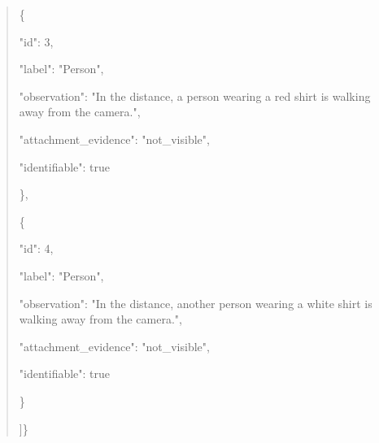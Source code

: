 \documentclass[10pt,a4paper]{article}
\begin{document}
\begin{quote}
\{\par
"id":\allowbreak{} 3,\allowbreak{}\par
"label":\allowbreak{} "Person",\allowbreak{}\par
"observation":\allowbreak{} "In the distance,\allowbreak{} a person wearing a red shirt is walking away from the camera.",\allowbreak{}\par
"attachment\_evidence":\allowbreak{} "not\_visible",\allowbreak{}\par
"identifiable":\allowbreak{} true\par
\},\allowbreak{}\par
\{\par
"id":\allowbreak{} 4,\allowbreak{}\par
"label":\allowbreak{} "Person",\allowbreak{}\par
"observation":\allowbreak{} "In the distance,\allowbreak{} another person wearing a white shirt is walking away from the camera.",\allowbreak{}\par
"attachment\_evidence":\allowbreak{} "not\_visible",\allowbreak{}\par
"identifiable":\allowbreak{} true\par
\}\par
]\}
\end{quote}
\end{document}
